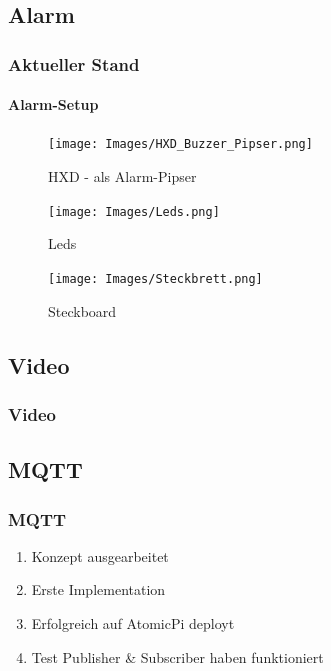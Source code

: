 \documentclass[]{beamer}
\begin{document}
\subsection{Alarm}

\begin{frame}
	\frametitle{Aktueller Stand}
	\framesubtitle{Alarm-Setup}
	\begin{figure}
		\centering
		\begin{minipage}{0.32\textwidth}
			\centering
			\texttt{[image: Images/HXD\_Buzzer\_Pipser.png]} 
			\caption{HXD - als Alarm-Pipser}
		\end{minipage}\hfill
		\begin{minipage}{0.32\textwidth}
			\centering
			\texttt{[image: Images/Leds.png]} 
			\caption{Leds}
		\end{minipage}\hfill
		\begin{minipage}{0.32\textwidth}
			\centering
			\texttt{[image: Images/Steckbrett.png]}
			\caption{Steckboard}
		\end{minipage}
	\end{figure}
	
\end{frame}

\subsection{Video}

\begin{frame}
	\frametitle{Video}
	
\end{frame}


\subsection{MQTT}
\begin{frame}
	\frametitle{MQTT}

	\begin{enumerate}
		\item Konzept ausgearbeitet
		\item Erste Implementation
		\item Erfolgreich auf AtomicPi deployt
		\item Test Publisher \& Subscriber haben funktioniert
	\end{enumerate}
\end{frame}
\end{document}
